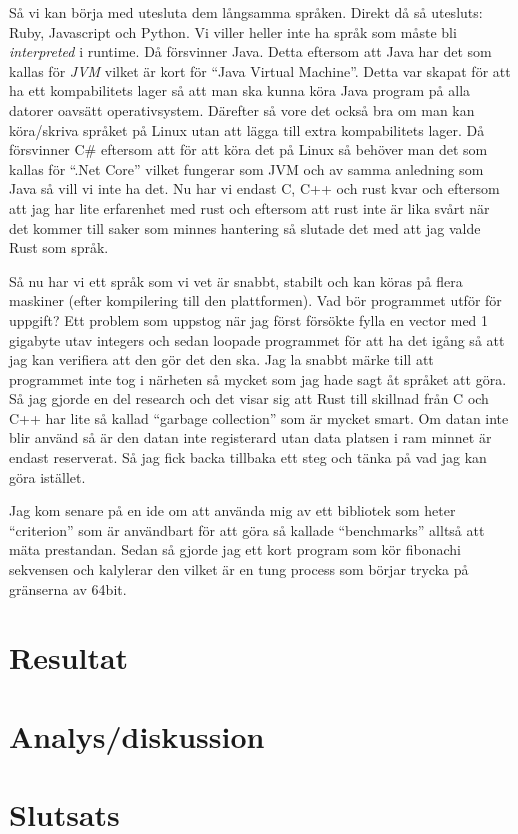 \documentclass[12pt, a4paper]{report}
\begin{document}
Så vi kan börja med utesluta dem långsamma språken. Direkt då så utesluts: Ruby, Javascript och Python. Vi viller heller inte ha språk som måste bli \textit{interpreted} i runtime. Då försvinner Java. Detta eftersom att Java har det som kallas för \textit{JVM} vilket är kort för ``Java Virtual Machine''. Detta var skapat för att ha ett kompabilitets lager så att man ska kunna köra Java program på alla datorer oavsätt operativsystem. Därefter så vore det också bra om man kan köra/skriva språket på Linux utan att lägga till extra kompabilitets lager. Då försvinner C\# eftersom att för att köra det på Linux så behöver man det som kallas för ``.Net Core'' vilket fungerar som JVM och av samma anledning som Java så vill vi inte ha det. Nu har vi endast C, C++ och rust kvar och eftersom att jag har lite erfarenhet med rust och eftersom att rust inte är lika svårt när det kommer till saker som minnes hantering så slutade det med att jag valde Rust som språk.


Så nu har vi ett språk som vi vet är snabbt, stabilt och kan köras på flera maskiner (efter kompilering till den plattformen). Vad bör programmet utför för uppgift? Ett problem som uppstog när jag först försökte fylla en vector med 1 gigabyte utav integers och sedan loopade programmet för att ha det igång så att jag kan verifiera att den gör det den ska. Jag la snabbt märke till att programmet inte tog i närheten så mycket som jag hade sagt åt språket att göra. Så jag gjorde en del research och det visar sig att Rust till skillnad från C och C++ har lite så kallad ``garbage collection'' som är mycket smart. Om datan inte blir använd så är den datan inte registerard utan data platsen i ram minnet är endast reserverat. Så jag fick backa tillbaka ett steg och tänka på vad jag kan göra istället.

Jag kom senare på en ide om att använda mig av ett bibliotek som heter ``criterion'' som är användbart för att göra så kallade ``benchmarks'' alltså att mäta prestandan. Sedan så gjorde jag ett kort program som kör fibonachi sekvensen och kalylerar den vilket är en tung process som börjar trycka på gränserna av 64bit.

\section{Resultat}

\section{Analys/diskussion}



\section{Slutsats}


\printbibliography
\end{document}
